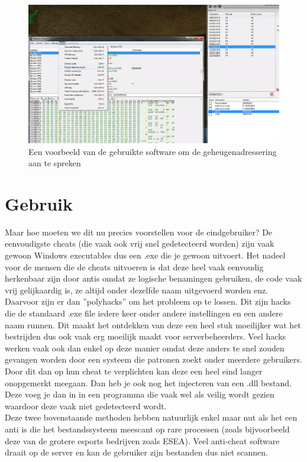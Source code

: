 \documentclass[pdftex,a4paper,12pt,twoside]{report}
\begin{document}
\begin{figure}[H]
\centering
\includegraphics[width=15cm]{img/aimhack-code-example}
\caption{Een voorbeeld van de gebruikte software om de geheugenadressering aan te spreken}
\end{figure}

\section{Gebruik}
\label{sec:gebruik}
Maar hoe moeten we dit nu precies voorstellen voor de eindgebruiker? De eenvoudigste \gls{cheat}s (die vaak ook vrij snel gedetecteerd worden) zijn vaak gewoon Windows executables dus een .exe die je gewoon uitvoert. Het nadeel voor de mensen die de \gls{cheat}s uitvoeren is dat deze heel vaak eenvoudig herkenbaar zijn door \gls{anti}s omdat ze logische benamingen gebruiken, de code vaak vrij gelijkaardig is, ze altijd onder dezelfde naam uitgevoerd worden enz.
\\

Daarvoor zijn er dan ''polyhacks'' om het probleem op te lossen. Dit zijn hacks die de standaard .exe file iedere keer onder andere instellingen en een andere naam runnen. Dit maakt het ontdekken van deze een heel stuk moeilijker wat het bestrijden dus ook vaak erg moeilijk maakt voor serverbeheerders. Veel hacks werken vaak ook dan enkel op deze manier omdat deze anders te snel zouden gevangen worden door een systeem die patronen zoekt onder meerdere gebruikers. Door dit dan op hun \gls{cheat} te verplichten kan deze een heel eind langer onopgemerkt meegaan.
\newpage
Dan heb je ook nog het injecteren van een .dll bestand. Deze voeg je dan in in een programma die vaak wel als veilig wordt gezien waardoor deze vaak niet gedetecteerd wordt. 
\\

Deze twee bovenstaande methoden hebben natuurlijk enkel maar nut als het een \gls{anti} is die het bestandssysteem meescant op rare processen (zoals bijvoorbeeld deze van de grotere \gls{esports} bedrijven zoals ESEA). Veel anti-cheat software draait op de server en kan de gebruiker zijn bestanden dus niet scannen. \citep{esea}
\end{document}
